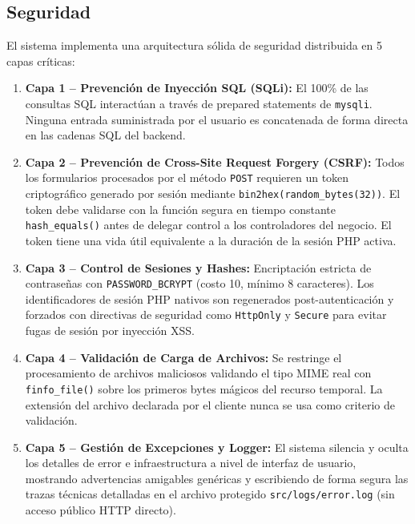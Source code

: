 \documentclass[11pt,a4paper]{report}
\begin{document}
\subsection{Seguridad}
El sistema implementa una arquitectura sólida de seguridad distribuida en 5 capas críticas:
\begin{enumerate}
    \item \textbf{Capa 1 -- Prevención de Inyección SQL (SQLi):} El 100\% de las consultas SQL interactúan a través de prepared statements de \texttt{mysqli}. Ninguna entrada suministrada por el usuario es concatenada de forma directa en las cadenas SQL del backend.
    \item \textbf{Capa 2 -- Prevención de Cross-Site Request Forgery (CSRF):} Todos los formularios procesados por el método \texttt{POST} requieren un token criptográfico generado por sesión mediante \texttt{bin2hex(random\_bytes(32))}. El token debe validarse con la función segura en tiempo constante \texttt{hash\_equals()} antes de delegar control a los controladores del negocio. El token tiene una vida útil equivalente a la duración de la sesión PHP activa.
    \item \textbf{Capa 3 -- Control de Sesiones y Hashes:} Encriptación estricta de contraseñas con \texttt{PASSWORD\_BCRYPT} (costo 10, mínimo 8 caracteres). Los identificadores de sesión PHP nativos son regenerados post-autenticación y forzados con directivas de seguridad como \texttt{HttpOnly} y \texttt{Secure} para evitar fugas de sesión por inyección XSS.
    \item \textbf{Capa 4 -- Validación de Carga de Archivos:} Se restringe el procesamiento de archivos maliciosos validando el tipo MIME real con \texttt{finfo\_file()} sobre los primeros bytes mágicos del recurso temporal. La extensión del archivo declarada por el cliente nunca se usa como criterio de validación.
    \item \textbf{Capa 5 -- Gestión de Excepciones y Logger:} El sistema silencia y oculta los detalles de error e infraestructura a nivel de interfaz de usuario, mostrando advertencias amigables genéricas y escribiendo de forma segura las trazas técnicas detalladas en el archivo protegido \texttt{src/logs/error.log} (sin acceso público HTTP directo).
\end{enumerate}
\end{document}
